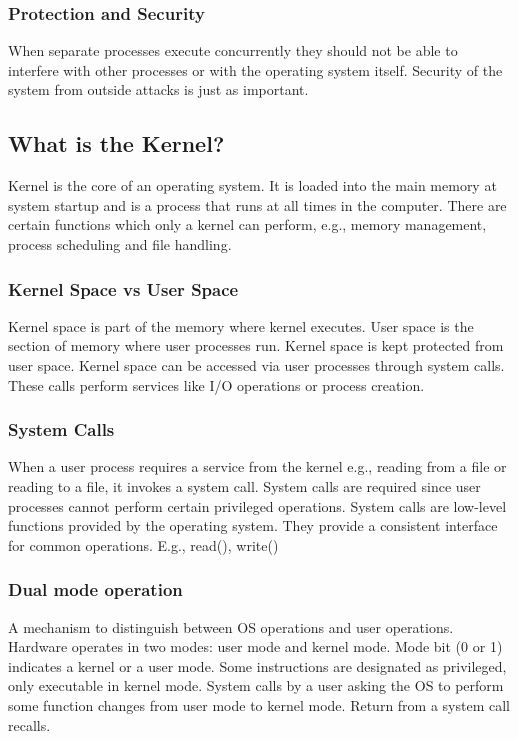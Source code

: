 \documentclass[a4paper]{article}
\theoremstyle{plain}
\theoremstyle{definition}
\newtheorem{defn}{Definition}[section]
\theoremstyle{remark}
\begin{document}
	\subsubsection{Protection and Security}
	When separate processes execute concurrently they should not be able to interfere with other processes or with the operating system itself. Security of the system from outside attacks is just as important.
	\subsection{What is the Kernel?}
	\begin{tcolorbox}[colback=black!3!white,colframe=black!60!white,title=\begin{defn}Kernel \label{Kernel}\end{defn}]
	Kernel is the core of an operating system. It is loaded into the main memory at system startup and is a process that runs at all times in the computer. There are certain functions which only a kernel can perform, e.g., memory management, process scheduling and file handling.
	\end{tcolorbox}
	\subsubsection{Kernel Space vs User Space}
	Kernel space is part of the memory where kernel executes. User space is the section of memory where user processes run. Kernel space is kept protected from user space. Kernel space can be accessed via user processes through system calls. These calls perform services like I/O operations or process creation.
	\subsubsection{System Calls}
	When a user process requires a service from the kernel e.g., reading from a file or reading to a file, it invokes a system call. System calls are required since user processes cannot perform certain privileged operations. System calls are low-level functions provided by the operating system. They provide a consistent interface for common operations. E.g., read(), write()
	\subsubsection{Dual mode operation}
	A mechanism to distinguish between OS operations and user operations. Hardware operates in two modes: user mode and kernel mode. Mode bit (0 or 1) indicates a kernel or a user mode. Some instructions are designated as privileged, only executable in kernel mode. System calls by a user asking the OS to perform some function changes from user mode to kernel mode. Return from a system call recalls.
\end{document}
